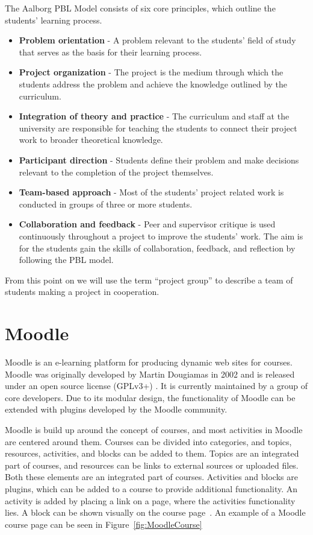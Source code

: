 The Aalborg PBL Model consists of six core principles, which outline the students' learning process.
\begin{itemize}
	\item \textbf{Problem orientation} - A problem relevant to the students' field of study that serves as the basis for their learning process.
	\item \textbf{Project organization} - The project is the medium through which the students address the problem and achieve the knowledge outlined by the curriculum.
	\item \textbf{Integration of theory and practice} - The curriculum and staff at the university are responsible for teaching the students to connect their project work to broader theoretical knowledge.
	\item \textbf{Participant direction} - Students define their problem and make decisions relevant to the completion of the project themselves.
	\item \textbf{Team-based approach} - Most of the students' project related work is conducted in groups of three or more students.
	\item \textbf{Collaboration and feedback} - Peer and supervisor critique is used continuously throughout a project to improve the students' work.
	The aim is for the students gain the skills of collaboration, feedback, and reflection by following the PBL model. 
\end{itemize}
From this point on we will use the term ``project group'' to describe a team of students making a project in cooperation.


\section{Moodle}
Moodle is an e-learning platform for producing dynamic web sites for courses. 
Moodle was originally developed by Martin Dougiamas in 2002 and is released under an open source license (GPLv3+) \citep{gpl}. 
It is currently maintained by a group of core developers. 
Due to its modular design, the functionality of Moodle can be extended with plugins developed by the Moodle community.

Moodle is build up around the concept of courses, and most activities in Moodle are centered around them. 
Courses can be divided into categories, and topics, resources, activities, and blocks can be added to them. 
Topics are an integrated part of courses, and resources can be links to external sources or uploaded files. 
Both these elements are an integrated part of courses. 
Activities and blocks are plugins, which can be added to a course to provide additional functionality. 
An activity is added by placing a link on a page, where the activities functionality lies. 
A block can be shown visually on the course page~\citep{moodleStructural}.
An example of a Moodle course page can be seen in Figure~\ref{fig:MoodleCourse}

